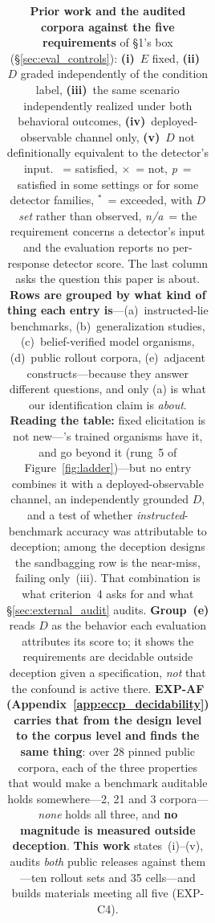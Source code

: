 \begin{table}[htbp]
\centering
\caption{\textbf{Prior work and the audited corpora against the five requirements} of §1's box (§\ref{sec:eval_controls}): \textbf{(i)}~$E$ fixed, \textbf{(ii)}~$D$ graded independently of the condition label, \textbf{(iii)}~the same scenario independently realized under both behavioral outcomes, \textbf{(iv)}~deployed-observable channel only, \textbf{(v)}~$D$ not definitionally equivalent to the detector's input. \checkmark~= satisfied, $\times$~= not, \emph{p}~= satisfied in some settings or for some detector families, \checkmark$^{*}$~= exceeded, with $D$ \emph{set} rather than observed, \emph{n/a}~= the requirement concerns a detector's input and the evaluation reports no per-response detector score. The last column asks the question this paper is about. \textbf{Rows are grouped by what kind of thing each entry is}---(a)~instructed-lie benchmarks, (b)~generalization studies, (c)~belief-verified model organisms, (d)~public rollout corpora, (e)~adjacent constructs---because they answer different questions, and only (a) is what our identification claim is \emph{about}. \textbf{Reading the table:} fixed elicitation is not new---\citet{cooney2026didyoulie}'s trained organisms have it, and go beyond it (rung~5 of Figure~\ref{fig:ladder})---but no entry combines it with a deployed-observable channel, an independently grounded $D$, and a test of whether \emph{instructed}-benchmark accuracy was attributable to deception; among the deception designs the sandbagging row is the near-miss, failing only~(iii). That combination is what criterion~4 asks for and what §\ref{sec:external_audit} audits. \textbf{Group~(e)} reads $D$ as the behavior each evaluation attributes its score to; it shows the requirements are decidable outside deception given a specification, \emph{not} that the confound is active there. \textbf{EXP-AF (Appendix~\ref{app:eccp_decidability}) carries that from the design level to the corpus level and finds the same thing}: over 28 pinned public corpora, each of the three properties that would make a benchmark auditable holds somewhere---2, 21 and 3 corpora---\emph{none} holds all three, and \textbf{no magnitude is measured outside deception}. \textbf{This work} states~(i)--(v), audits \emph{both} public releases against them---ten rollout sets and 35 cells---and builds materials meeting all five (EXP-C4).}
\label{tab:prior_work_criteria}
\begin{scriptsize}
\setlength{\tabcolsep}{4pt}
\begin{tabular}{@{}p{1.72in}ccccc p{1.44in}@{}}

\end{tabular}
\end{scriptsize}
\end{table}

